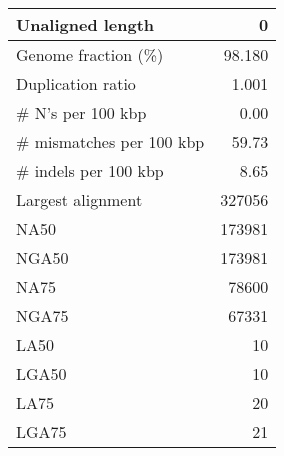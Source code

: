 \documentclass[12pt,a4paper]{article}
\begin{document}
\begin{table}[ht]
\begin{center}
\begin{tabular}{|l*{1}{|r}|}
Unaligned length & 0 \\ \hline
Genome fraction (\%) & 98.180 \\ \hline
Duplication ratio & 1.001 \\ \hline
\# N's per 100 kbp & 0.00 \\ \hline
\# mismatches per 100 kbp & 59.73 \\ \hline
\# indels per 100 kbp & 8.65 \\ \hline
Largest alignment & 327056 \\ \hline
NA50 & 173981 \\ \hline
NGA50 & 173981 \\ \hline
NA75 & 78600 \\ \hline
NGA75 & 67331 \\ \hline
LA50 & 10 \\ \hline
LGA50 & 10 \\ \hline
LA75 & 20 \\ \hline
LGA75 & 21 \\ \hline
\end{tabular}
\end{center}
\end{table}
\end{document}
